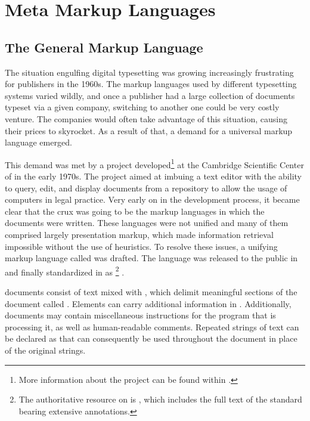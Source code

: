 \documentclass[a5paper,10pt]{book}
\begin{document}
\section{Meta Markup Languages}
\subsection{The General Markup Language}
The situation engulfing digital typesetting was growing increasingly frustrating
for publishers in the 1960s. The markup languages used by different typesetting
systems varied wildly, and once a publisher had a large collection of documents
typeset via a given company, switching to another one could be very costly
venture. The companies would often take advantage of this situation, causing
their prices to skyrocket. As a result of that, a demand for a universal markup
language emerged.

This demand was met by a project developed\footnote{
  More information about the project can be found within
  \textcite{goldfarb96,goldfarb97:whySGML}.
} at the Cambridge Scientific Center of  in the early 1970s. The
project aimed at imbuing a text editor with the ability to query, edit, and
display documents from a repository to allow the usage of computers in legal
practice. Very early on in the development process, it became clear that the
crux was going to be the markup languages in which the documents were written.
These languages were not unified and many of them comprised largely presentation
markup, which made information retrieval impossible without the use of
heuristics. To resolve these issues, a unifying markup language called
 was drafted. The language was released \cite{goldfarb81}
to the public in \cite{goldfarb81} and finally standardized in \citeyear{iso86}
as \footnote{
  The authoritative resource on  is \textcite{goldfarb91}, which
  includes the full text of the standard bearing extensive annotations.
} \cite{iso86}.

 documents consist of text mixed with %
, which delimit meaningful sections of the document called
. Elements can carry additional
information in . Additionally,
 documents may contain miscellaneous instructions for the program
that is processing it, as well as human-readable comments. Repeated strings of
text can be declared as  
that can consequently be used throughout the document in place of the original
strings.
\end{document}
